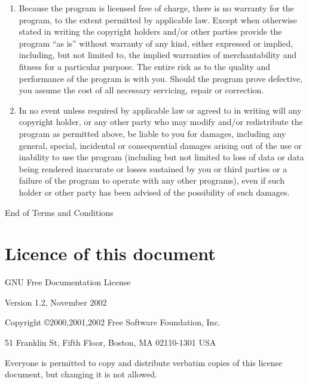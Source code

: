 \documentclass[a4paper,11pt]{article}
\begin{document}
\begin{enumerate}
\begin{center}
{\Large\sc
No Warranty
}
\end{center}

\item
{\sc Because the program is licensed free of charge, there is no warranty
for the program, to the extent permitted by applicable law.  Except when
otherwise stated in writing the copyright holders and/or other parties
provide the program ``as is'' without warranty of any kind, either expressed
or implied, including, but not limited to, the implied warranties of
merchantability and fitness for a particular purpose.  The entire risk as
to the quality and performance of the program is with you.  Should the
program prove defective, you assume the cost of all necessary servicing,
repair or correction.}

\item
{\sc In no event unless required by applicable law or agreed to in writing
will any copyright holder, or any other party who may modify and/or
redistribute the program as permitted above, be liable to you for damages,
including any general, special, incidental or consequential damages arising
out of the use or inability to use the program (including but not limited
to loss of data or data being rendered inaccurate or losses sustained by
you or third parties or a failure of the program to operate with any other
programs), even if such holder or other party has been advised of the
possibility of such damages.}

\end{enumerate}


\begin{center}
{\Large\sc End of Terms and Conditions}
\end{center}

    \section{Licence of this document}

 \begin{center}


{\Large GNU Free Documentation License}

       Version 1.2, November 2002

 Copyright \copyright 2000,2001,2002  Free Software Foundation, Inc.
 
 \bigskip
 
     51 Franklin St, Fifth Floor, Boston, MA  02110-1301  USA
  
 \bigskip
 
 Everyone is permitted to copy and distribute verbatim copies
 of this license document, but changing it is not allowed.
\end{center}
\end{document}
